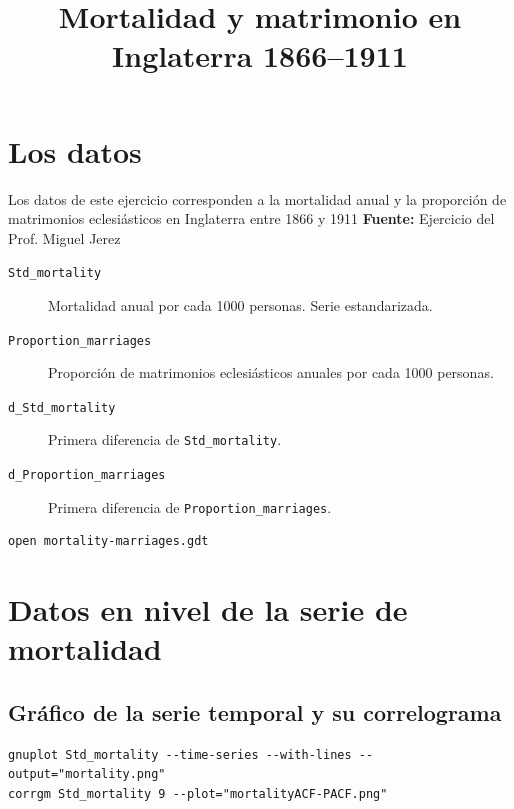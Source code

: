 \documentclass[10pt]{article}
\date{}
\title{Mortalidad y matrimonio en Inglaterra 1866--1911}
\begin{document}
\maketitle
\section*{Los datos}
\label{sec:orga6df374}

Los datos de este ejercicio corresponden a la mortalidad anual y la
proporción de matrimonios eclesiásticos en Inglaterra entre 1866 y
1911 \textbf{Fuente:} Ejercicio del Prof. Miguel Jerez 

\begin{description}
\item[{\texttt{Std\_mortality}}] Mortalidad anual por cada 1000 personas. Serie estandarizada.
\item[{\texttt{Proportion\_marriages}}] Proporción de matrimonios eclesiásticos
anuales por cada 1000 personas.
\item[{\texttt{d\_Std\_mortality}}] Primera diferencia de \texttt{Std\_mortality}.
\item[{\texttt{d\_Proportion\_marriages}}] Primera diferencia de
\texttt{Proportion\_marriages}.
\end{description}

\begin{verbatim}
open mortality-marriages.gdt
\end{verbatim}
\section*{Datos en nivel de la serie de mortalidad}
\label{sec:orgebe8751}

\subsection*{Gráfico de la serie temporal y su correlograma}
\label{sec:orgcc82df0}

\begin{verbatim}
gnuplot Std_mortality --time-series --with-lines --output="mortality.png"
corrgm Std_mortality 9 --plot="mortalityACF-PACF.png"
\end{verbatim}
\end{document}
